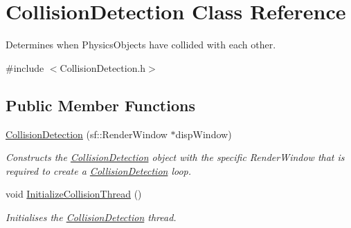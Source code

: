 \hypertarget{class_collision_detection}{}\section{Collision\+Detection Class Reference}
\label{class_collision_detection}


Determines when Physics\+Objects have collided with each other.  




{\ttfamily \#include $<$Collision\+Detection.\+h$>$}

\subsection*{Public Member Functions}
\begin{DoxyCompactItemize}
\item 
\hyperlink{class_collision_detection_a2f88d35b750b96c0da3b09460d8f02bd}{Collision\+Detection} (sf\+::\+Render\+Window $\ast$disp\+Window)
\begin{DoxyCompactList}\small\item\em Constructs the \hyperlink{class_collision_detection}{Collision\+Detection} object with the specific Render\+Window that is required to create a \hyperlink{class_collision_detection}{Collision\+Detection} loop. \end{DoxyCompactList}\item 
\mbox{\label{class_collision_detection_a6fcb59ac9cafa41ba26912f72c1bf990}} 
void \hyperlink{class_collision_detection_a6fcb59ac9cafa41ba26912f72c1bf990}{Initialize\+Collision\+Thread} ()
\begin{DoxyCompactList}\small\item\em Initialises the \hyperlink{class_collision_detection}{Collision\+Detection} thread. \end{DoxyCompactList}\end{DoxyCompactItemize}

